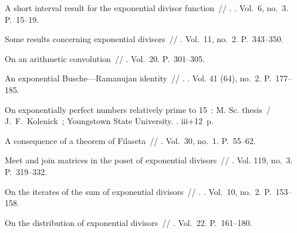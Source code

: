 \documentclass[12pt,a4paper]{article}
\begin{document}
\begin{thebibliography}{10}
 A short interval result for the exponential divisor
  function~// . \BibDash
{}. \BibDash
\newblock Vol.~6, no.~3. \BibDash
\newblock P.~15--19.

 Some results concerning exponential divisors~//
  \href{http://dx.doi.org/10.1155/S0161171288000407}{} \BibDash
{}. \BibDash
\newblock Vol.~11, no.~2. \BibDash
\newblock P.~343--350.

 On an arithmetic convolution~//
  \href{http://dx.doi.org/10.4153/CMB-1977-046-9}{}
  \BibDash
{}. \BibDash
\newblock Vol.~20. \BibDash
\newblock P.~301--305.

 An exponential Busche---Ramanujan identity~//
  . \BibDash
{}. \BibDash
\newblock Vol. 41 (64), no.~2. \BibDash
\newblock P.~177--185.

 On exponentially perfect numbers relatively prime to
  15~: M. Sc. thesis~/ J.~F.~Kolenick~; Youngstown State University. \BibDash
{}. \BibDash
\newblock iii+12~p.

 A consequence of a
  theorem of Filaseta~//  \BibDash
{}. \BibDash
\newblock Vol.~30, no.~1. \BibDash
\newblock P.~55--62.

 Meet and join matrices in the poset of
  exponential divisors~//
  \href{http://dx.doi.org/10.1007/s12044-009-0031-2}{} \BibDash
{}. \BibDash
\newblock Vol. 119, no.~3. \BibDash
\newblock P.~319--332.

 On the iterates of the sum of exponential
  divisors~// . \BibDash
{}. \BibDash
\newblock Vol.~10, no.~2. \BibDash
\newblock P.~153--158.

 On the distribution of exponential
  divisors~// 
  \BibDash
{}. \BibDash
\newblock Vol.~22. \BibDash
\newblock P.~161--180.


\end{thebibliography}
\end{document}
